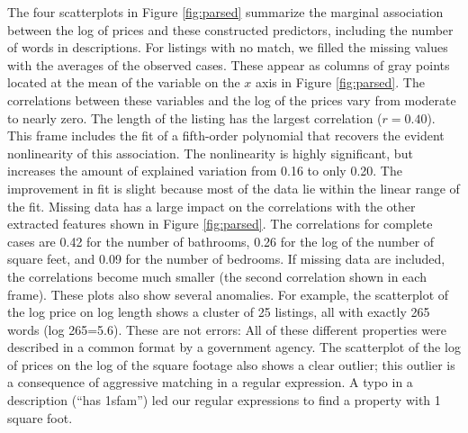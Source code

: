 \documentclass[10pt]{article}
\begin{document}
 The four scatterplots in Figure \ref{fig:parsed} summarize the marginal
 association between the log of prices and these constructed predictors,
 including the number of words in descriptions.  For listings with no match, we
 filled the missing values with the averages of the observed cases.  These
 appear as columns of gray points located at the mean of the variable on the $x$
 axis in Figure \ref{fig:parsed}.  The correlations between these variables and
 the log of the prices vary from moderate to nearly zero.  The length of the
 listing has the largest correlation ($r=0.40$). This frame includes the fit of
 a fifth-order polynomial that recovers the evident nonlinearity of this
 association.  The nonlinearity is highly significant, but increases the amount
 of explained variation from 0.16 to only 0.20.  The improvement in fit is
 slight because most of the data lie within the linear range of the fit.
  Missing data has a large impact on the correlations with the other extracted
 features shown in Figure \ref{fig:parsed}.  The correlations for complete cases
 are 0.42 for the number of bathrooms, 0.26 for the log of the number of square
 feet, and 0.09 for the number of bedrooms.  If missing data are included, the
 correlations become much smaller (the second correlation shown in each frame).
  These plots also show several anomalies.  For example, the scatterplot of the
 log price on log length shows a cluster of 25 listings, all with exactly 265
 words (log 265=5.6).  These are not errors: All of these different properties
 were described in a common format by a government agency.  The scatterplot of
 the log of prices on the log of the square footage also shows a clear outlier;
 this outlier is a consequence of aggressive matching in a regular expression.
  A typo in a description (``has 1sfam'') led our regular expressions to find a
 property with 1 square foot.
\end{document}

